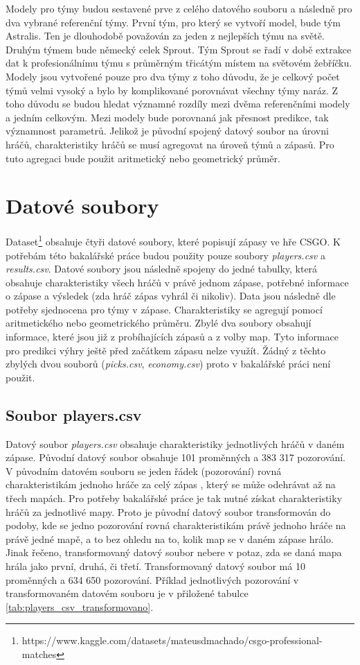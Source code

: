 Modely pro týmy budou sestavené prve z celého datového souboru a následně pro dva vybrané referenční týmy. První tým, pro který se vytvoří model, bude tým Astralis.
Ten je dlouhodobě považován za jeden z nejlepších týmu na světě. Druhým týmem bude německý celek Sprout. Tým Sprout se řadí v době
extrakce dat k profesionálnímu týmu s průměrným třicátým místem na světovém žebříčku. Modely jsou vytvořené pouze pro dva týmy z toho důvodu, že je celkový
počet týmů velmi vysoký a bylo by komplikované 
porovnávat všechny týmy naráz. Z toho důvodu se budou hledat významné rozdíly mezi dvěma referenčními modely a jedním celkovým. Mezi modely bude porovnaná jak přesnost
predikce, tak významnost parametrů. Jelikož je původní spojený datový soubor na úrovni hráčů, charakteristiky hráčů se musí agregovat na úroveň týmů a zápasů. Pro tuto
agregaci bude použit aritmetický nebo geometrický průměr.


\section{Datové soubory}
Dataset\footnote{https://www.kaggle.com/datasets/mateusdmachado/csgo-professional-matches} obsahuje čtyři 
datové soubory,
které popisují zápasy ve hře
\ac{CSGO}. K potřebám této bakalářské práce budou použity pouze soubory \textit{players.csv} a \textit{results.csv}. Datové soubory jsou následně spojeny do jedné tabulky,
která obsahuje charakteristiky všech hráčů v právě jednom zápase, potřebné informace o zápase a výsledek (zda hráč zápas vyhrál či nikoliv). Data jsou následně dle potřeby
sjednocena pro týmy v zápase. Charakteristiky se agregují pomocí aritmetického nebo geometrického průměru. Zbylé dva soubory obsahují
informace, které jsou již z probíhajících zápasů a z volby map. Tyto informace pro predikci výhry ještě před začátkem zápasu nelze využít. Žádný z těchto
zbylých dvou souborů (\textit{picks.csv}, \textit{economy.csv}) proto v bakalářské práci není použit.

\subsection{Soubor players.csv}
Datový soubor
\textit{players.csv} obsahuje 
charakteristiky
jednotlivých hráčů v daném zápase. Původní datový soubor obsahuje 101 proměnných a 383 317 pozorování.
V původním datovém souboru se jeden řádek (pozorování) rovná charakteristikám jednoho hráče za celý zápas
, který se může odehrávat až na třech mapách.
Pro potřeby bakalářské práce je tak nutné získat charakteristiky hráčů
za jednotlivé mapy. Proto je původní datový soubor transformován do podoby, kde se jedno pozorování rovná charakteristikám
právě jednoho hráče na právě jedné mapě, a to bez ohledu na to, kolik map se v daném zápase hrálo. Jinak řečeno, transformovaný datový soubor nebere v potaz, zda
se daná mapa hrála jako první, druhá, či třetí.
Transformovaný datový soubor má 10 proměnných a 634 650 pozorování. Příklad jednotlivých pozorování v transformovaném
datovém souboru je v přiložené tabulce \ref{tab:players_csv_transformovano}.

